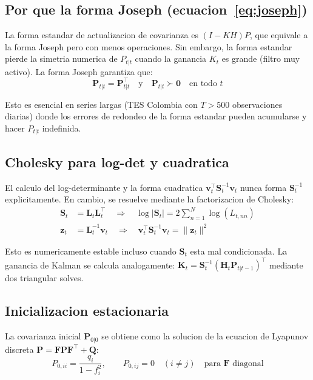\documentclass[12pt, a4paper]{article}
\theoremstyle{plain}
\theoremstyle{definition}
\theoremstyle{remark}
\newcommand{\bH}{\mathbf{H}}
\newcommand{\bF}{\mathbf{F}}
\newcommand{\bQ}{\mathbf{Q}}
\newcommand{\bP}{\mathbf{P}}
\newcommand{\bK}{\mathbf{K}}
\newcommand{\bS}{\mathbf{S}}
\newcommand{\bL}{\mathbf{L}}
\newcommand{\bzero}{\mathbf{0}}
\newcommand{\bv}{\mathbf{v}}
\newcommand{\bz}{\mathbf{z}}
\begin{document}
\subsection{Por que la forma Joseph (ecuacion~\ref{eq:joseph})}

La forma estandar de actualizacion de covarianza es $(I-KH)P$, que equivale
a la forma Joseph pero con menos operaciones. Sin embargo, la forma estandar
pierde la simetria numerica de $P_{t|t}$ cuando la ganancia $K_t$ es grande
(filtro muy activo). La forma Joseph garantiza que:
\begin{equation}
  \bP_{t|t} = \bP_{t|t}^\top \quad \text{y} \quad
  \bP_{t|t} \succ \bzero
  \quad \text{en todo } t
  \label{eq:joseph_property}
\end{equation}

Esto es esencial en series largas (TES Colombia con $T > 500$ observaciones
diarias) donde los errores de redondeo de la forma estandar pueden
acumularse y hacer $P_{t|t}$ indefinida.

\subsection{Cholesky para log-det y cuadratica}

El calculo del log-determinante y la forma cuadratica
$\bv_t^\top \bS_t^{-1}\bv_t$ nunca forma $\bS_t^{-1}$ explicitamente.
En cambio, se resuelve mediante la factorizacion de Cholesky:
\begin{align}
  \bS_t &= \bL_t\bL_t^\top \quad \Rightarrow \quad
  \log|\bS_t| = 2\sum_{n=1}^N \log(L_{t,nn})
  \label{eq:chol_det} \\
  \bz_t &= \bL_t^{-1}\bv_t \quad \Rightarrow \quad
  \bv_t^\top\bS_t^{-1}\bv_t = \|\bz_t\|^2
  \label{eq:chol_quad}
\end{align}

Esto es numericamente estable incluso cuando $\bS_t$ esta mal condicionada.
La ganancia de Kalman se calcula analogamente: $\bK_t = \bS_t^{-1}(\bH_t\bP_{t|t-1})^\top$
mediante dos triangular solves.

\subsection{Inicializacion estacionaria}

La covarianza inicial $\bP_{0|0}$ se obtiene como la solucion de la
ecuacion de Lyapunov discreta $\bP = \bF\bP\bF^\top + \bQ$:
\begin{equation}
  P_{0,ii} = \frac{q_i}{1 - f_i^2}, \qquad
  P_{0,ij} = 0 \quad (i \neq j)
  \quad \text{para } \bF \text{ diagonal}
  \label{eq:p0}
\end{equation}
\end{document}
